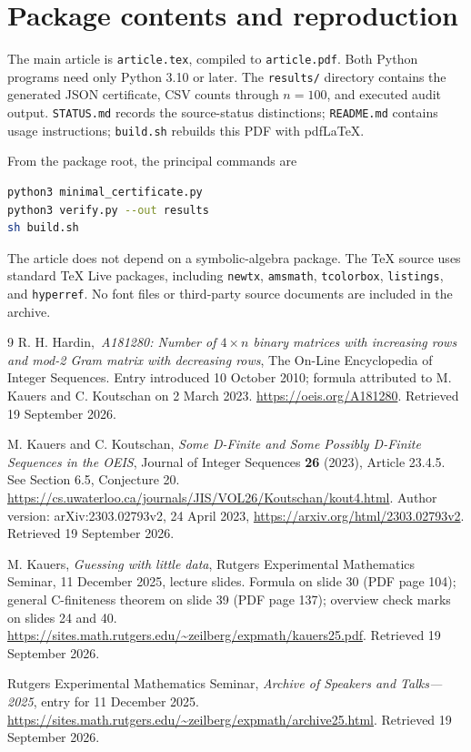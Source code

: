 \documentclass[11pt,letterpaper]{article}
\theoremstyle{definition}
\newcommand{\1}{\mathbf 1}
\begin{document}
\section{Package contents and reproduction}
The main article is \texttt{article.tex}, compiled to \texttt{article.pdf}.
Both Python programs need only Python 3.10 or later. The \texttt{results/} directory contains the generated
JSON certificate, CSV counts through $n=100$, and executed audit output.
\texttt{STATUS.md} records the source-status distinctions; \texttt{README.md}
contains usage instructions; \texttt{build.sh} rebuilds this PDF with pdfLaTeX.

From the package root, the principal commands are
\begin{lstlisting}[language=bash]
python3 minimal_certificate.py
python3 verify.py --out results
sh build.sh
\end{lstlisting}
The article does not depend on a symbolic-algebra package. The TeX source uses
standard TeX Live packages, including \texttt{newtx}, \texttt{amsmath},
\texttt{tcolorbox}, \texttt{listings}, and \texttt{hyperref}. No font files or
third-party source documents are included in the archive.

\begin{thebibliography}{9}
R. H. Hardin,\
\emph{A181280: Number of $4\times n$ binary matrices with increasing rows and
mod-2 Gram matrix with decreasing rows},
The On-Line Encyclopedia of Integer Sequences.
Entry introduced 10 October 2010; formula attributed to M. Kauers and
C. Koutschan on 2 March 2023.
\url{https://oeis.org/A181280}.
Retrieved 19 September 2026.

M. Kauers and C. Koutschan,
\emph{Some D-Finite and Some Possibly D-Finite Sequences in the OEIS},
Journal of Integer Sequences \textbf{26} (2023), Article 23.4.5.
See Section 6.5, Conjecture 20.
\url{https://cs.uwaterloo.ca/journals/JIS/VOL26/Koutschan/kout4.html}.
Author version: arXiv:2303.02793v2, 24 April 2023,
\url{https://arxiv.org/html/2303.02793v2}.
Retrieved 19 September 2026.

M. Kauers,
\emph{Guessing with little data},
Rutgers Experimental Mathematics Seminar, 11 December 2025, lecture slides.
Formula on slide 30 (PDF page 104); general C-finiteness theorem on slide 39
(PDF page 137); overview check marks on slides 24 and 40.
\url{https://sites.math.rutgers.edu/~zeilberg/expmath/kauers25.pdf}.
Retrieved 19 September 2026.

Rutgers Experimental Mathematics Seminar,
\emph{Archive of Speakers and Talks---2025}, entry for 11 December 2025.
\url{https://sites.math.rutgers.edu/~zeilberg/expmath/archive25.html}.
Retrieved 19 September 2026.
\end{thebibliography}
\end{document}
